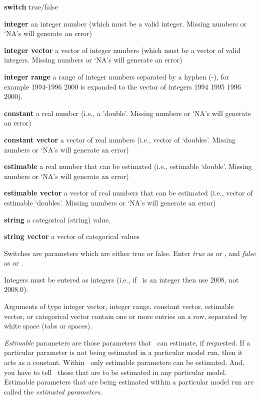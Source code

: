 \begin{description}
\item \textbf{switch} true/false 
\item \textbf{integer} an integer number (which must be a valid integer. Missing numbers or `NA's will generate an error)
\item \textbf{integer vector} a vector of integer numbers (which must be a vector of valid integers. Missing numbers or `NA's will generate an error)
\item \textbf{integer range} a range of integer numbers separated by a hyphen (-), for example 1994-1996 2000 is expanded to the vector of integers 1994 1995 1996 2000). 
\item \textbf{constant} a real number (i.e., a 'double'. Missing numbers or `NA's will generate an error)
\item \textbf{constant vector} a vector of real numbers (i.e., vector of `doubles'. Missing numbers or `NA's will generate an error)
\item \textbf{estimable} a real number that can be estimated (i.e., estimable `double'. Missing numbers or `NA's will generate an error)
\item \textbf{estimable vector} a vector of real numbers that can be estimated (i.e., vector of estimable `doubles'. Missing numbers or `NA's will generate an error)
\item \textbf{string} a categorical (string) value.
\item \textbf{string vector} a vector of categorical values
\end{description}

Switches are parameters which are either true or false. Enter \emph{true} as  or , and \emph{false} as  or . 

Integers must be entered as integers (i.e., if \ is an integer then use 2008, not 2008.0). 

Arguments of type integer vector, integer range, constant vector, estimable vector, or categorical vector contain one or more entries on a row, separated by white space (tabs or spaces). 

\emph{Estimable} parameters are those parameters that \SPM\ can estimate, if requested. If a particular parameter is not being estimated in a particular model run, then it acts as a constant.  Within \SPM\, only estimable parameters can be estimated. And, you have to tell \SPM\ those that are to be estimated in any particular model. Estimable parameters that are being estimated within a particular model run are called the \emph{estimated parameters}.

